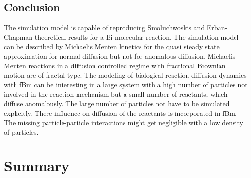 \documentclass[
  a4paper,BCOR10mm,oneside,
  headsepline,footsepline,%
  fleqn,openbib
]{scrbook}
\begin{document}
\newpage
\section{Conclusion}
The simulation model is capable of reproducing Smoluchwoskis and Erban-Chapman theoretical results for a Bi-molecular reaction. 
The simulation model can be described by Michaelis Menten kinetics for the quasi steady state approximation for normal diffusion but not for anomalous diffusion.
Michaelis Menten reactions in a diffusion controlled regime with fractional Brownian motion are of fractal type. The modeling of biological reaction-diffusion dynamics with fBm can be interesting in a large system with a high number of particles not involved in the reaction mechanism but a small number of reactants, which diffuse anomalously. The large number of particles not  have to be simulated explicitly. There influence on diffusion of the reactants is incorporated in fBm. The missing particle-particle interactions might get negligible with a low density of particles.  
\chapter{Summary}
\end{document}

